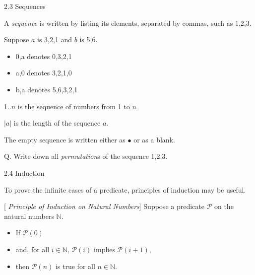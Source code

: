 \documentclass[table]{beamer}
\begin{document}
\begin{frame}[t]{2.3 Sequences} \vspace{10pt}

A {\it \color{red} sequence} is written by listing its elements, separated by commas, such as 1,2,3.

\vspace{10pt}

Suppose $a$ is 3,2,1 and $b$ is 5,6.
\begin{itemize}
\item 0,a denotes 0,3,2,1
\item a,0 denotes 3,2,1,0
\item b,a denotes 5,6,3,2,1
\end{itemize}

\vspace{10pt}

1..$n$ is the sequence of numbers from 1 to $n$

\vspace{10pt}

$|a|$ is the length of the sequence $a$. 

\vspace{10pt}

The empty sequence is written either as $\bullet$ or as a blank. 

\vspace{10pt}

Q. Write down all {\it \color{red} permutation}s of the sequence 1,2,3. 

\end{frame}

\begin{frame}[t]{2.4 Induction} \vspace{10pt}

To prove the infinite cases of a predicate, principles of induction may be useful.

\vspace{10pt}


[{\it \color{red} Principle of Induction on Natural Numbers}]
Suppose a predicate $\mathcal{P}$ on the natural numbers $\mathbb{N}$. 
\begin{itemize}
\item[] If $\mathcal{P}(0)$
\item[] and, for all $i\in \mathbb{N}$, $\mathcal{P}(i)$ implies $\mathcal{P}(i+1)$,
\item[] then $\mathcal{P}(n)$ is true for all $n \in \mathbb{N}$.
\end{itemize}

\end{frame}
\end{document}
